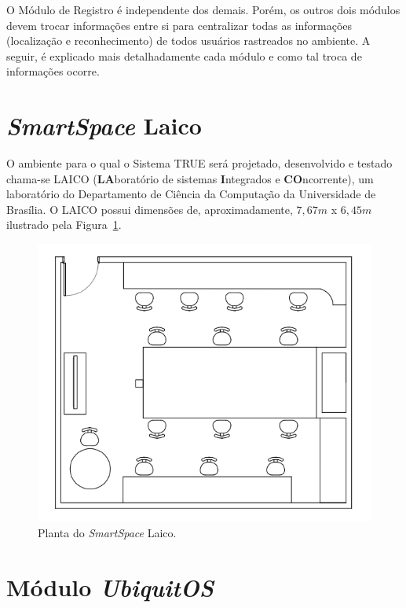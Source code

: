 O Módulo de Registro é independente dos demais. Porém, os outros dois módulos devem trocar informações entre si para centralizar todas as informações (localização e reconhecimento) de todos usuários rastreados no ambiente. A seguir, é explicado mais detalhadamente cada módulo e como tal troca de informações ocorre.



	
	
	
	



	\section{\textit{SmartSpace} Laico}

		O ambiente para o qual o Sistema TRUE será projetado, desenvolvido e testado
		chama-se LAICO (\textbf{LA}boratório de sistemas \textbf{I}ntegrados e
		\textbf{CO}ncorrente), um laboratório do Departamento de Ciência da Computação
		da Universidade de Brasília. O LAICO possui dimensões de, aproximadamente, 
		$\displaystyle 7,67m$ x $\displaystyle 6,45m$ ilustrado pela
		Figura~\ref{fig:laico}.
	
		\begin{figure}[hbt]
			\begin{center}
				\includegraphics[scale=0.6]{figuras/4.ProblemaEProposta/laico.png}
			\end{center}
			\caption{Planta do \textit{SmartSpace} Laico.}
			\label{fig:laico}
		\end{figure}	


\section{Módulo \textit{UbiquitOS}}














